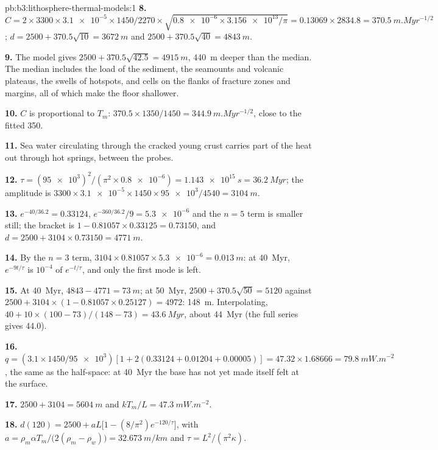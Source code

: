 \begin{solution}{pb:b3:lithosphere-thermal-models:1}
\textbf{8.} $C = 2\times3300\times\num{3.1e-5}\times1450/2270\times
\sqrt{\num{0.8e-6}\times\num{3.156e13}/\pi} = 0.13069\times2834.8 =
\qty{370.5}{m.Myr^{-1/2}}$; $d = 2500 + 370.5\sqrt{10} = \qty{3672}{m}$ and
$2500 + 370.5\sqrt{40} = \qty{4843}{m}$.

\textbf{9.} The model gives $2500 + 370.5\sqrt{42.5} = \qty{4915}{m}$,
\qty{440}{m} deeper than the median. The median includes the load of the
sediment, the seamounts and volcanic plateaus, the swells of hotspots, and
cells on the flanks of fracture zones and margins, all of which make the floor
shallower.

\textbf{10.} $C$ is proportional to $T_m$: $370.5\times1350/1450 =
\qty{344.9}{m.Myr^{-1/2}}$, close to the fitted 350.

\textbf{11.} Sea water circulating through the cracked young crust carries
part of the heat out through hot springs, between the probes.

\textbf{12.} $\tau = (\num{95e3})^2/(\pi^2\times\num{0.8e-6}) =
\qty{1.143e15}{s} = \qty{36.2}{Myr}$; the amplitude is $3300\times
\num{3.1e-5}\times1450\times\num{95e3}/4540 = \qty{3104}{m}$.

\textbf{13.} $e^{-40/36.2} = 0.33124$, $e^{-360/36.2}/9 = \num{5.3e-6}$ and the
$n = 5$ term is smaller still; the bracket is $1 - 0.81057\times0.33125 =
0.73150$, and $d = 2500 + 3104\times0.73150 = \qty{4771}{m}$.

\textbf{14.} By the $n = 3$ term, $3104\times0.81057\times\num{5.3e-6} =
\qty{0.013}{m}$: at \qty{40}{Myr}, $e^{-9t/\tau}$ is $10^{-4}$ of
$e^{-t/\tau}$, and only the first mode is left.

\textbf{15.} At \qty{40}{Myr}, $4843 - 4771 = \qty{73}{m}$; at
\qty{50}{Myr}, $2500 + 370.5\sqrt{50} = 5120$ against $2500 + 3104\times(1 -
0.81057\times0.25127) = 4972$: \qty{148}{m}. Interpolating, $40 + 10\times
(100 - 73)/(148 - 73) = \qty{43.6}{Myr}$, about \qty{44}{Myr} (the full series
gives 44.0).

\textbf{16.} $q = (3.1\times1450/\num{95e3})[1 + 2(0.33124 + 0.01204 +
0.00005)] = 47.32\times1.68666 = \qty{79.8}{mW.m^{-2}}$, the same as the
half-space: at \qty{40}{Myr} the base has not yet made itself felt at the
surface.

\textbf{17.} $2500 + 3104 = \qty{5604}{m}$ and $kT_m/L = \qty{47.3}{mW.m^{-2}}$.

\textbf{18.} $d(120) = 2500 + aL\bigl[1 - (8/\pi^2)e^{-120/\tau}\bigr]$, with
$a = \rho_m\alpha T_m/\bigl(2(\rho_m - \rho_w)\bigr) = \qty{32.673}{m/km}$ and
$\tau = L^2/(\pi^2\kappa)$.


\end{solution}
